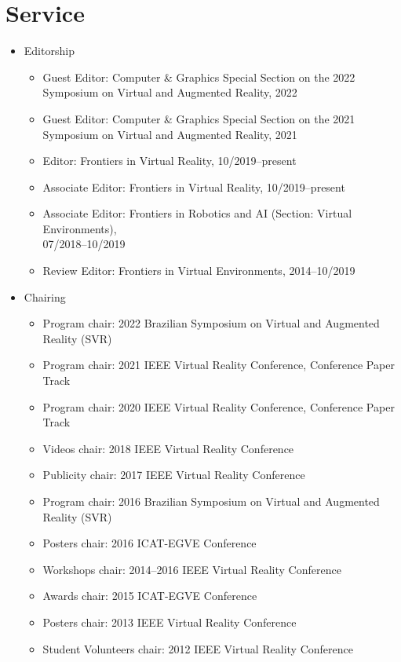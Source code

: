 \documentclass[wideaddress]{vitae}
\let\olditem\item
\def\item{\nopagebreak[4]\olditem}%
\begin{document}
\section{Service}
\begin{itemize}
	\item{Editorship}
		\begin{itemize}
			\item{Guest Editor: Computer \& Graphics Special Section on the 2022 Symposium on Virtual and Augmented Reality, 2022}
                \item{Guest Editor: Computer \& Graphics Special Section on the 2021 Symposium on Virtual and Augmented Reality, 2021}
			\item{Editor: Frontiers in Virtual Reality, 10/2019--present}
			\item{Associate Editor: Frontiers in Virtual Reality, 10/2019--present}
			\item{Associate Editor: Frontiers in Robotics and AI (Section: Virtual Environments), \\07/2018--10/2019}
			\item{Review Editor: Frontiers in Virtual Environments, 2014--10/2019}
		\end{itemize}
	\item{Chairing}
		\begin{itemize}
			\item{Program chair: 2022 Brazilian Symposium on Virtual and Augmented Reality (SVR)}
			\item{Program chair: 2021 IEEE Virtual Reality Conference, Conference Paper Track}
			\item{Program chair: 2020 IEEE Virtual Reality Conference, Conference Paper Track}
			\item{Videos chair: 2018 IEEE Virtual Reality Conference}
			\item{Publicity chair: 2017 IEEE Virtual Reality Conference}
			\item{Program chair: 2016 Brazilian Symposium on Virtual and Augmented Reality (SVR)}
			\item{Posters chair: 2016 ICAT-EGVE Conference}
			\item{Workshops chair: 2014--2016 IEEE Virtual Reality Conference}
			\item{Awards chair: 2015 ICAT-EGVE Conference}
			\item{Posters chair: 2013 IEEE Virtual Reality Conference}
			\item{Student Volunteers chair: 2012 IEEE Virtual Reality Conference}

\end{itemize}
\end{itemize}
\end{document}
